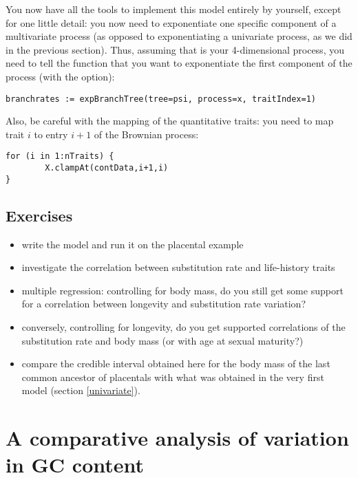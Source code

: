 You now have all the tools to implement this model entirely by yourself, except for one little detail: you now need to exponentiate one specific component of a multivariate process (as opposed to exponentiating a univariate process, as we did in the previous section). Thus, assuming that  is your 4-dimensional process, you need to tell the  function that you want to exponentiate the first component of the process (with the  option):
{\tt \small \begin{snugshade*}
\begin{lstlisting}
branchrates := expBranchTree(tree=psi, process=x, traitIndex=1)
\end{lstlisting}
\end{snugshade*}}
Also, be careful with the mapping of the quantitative traits: you need to map trait $i$ to entry $i+1$ of the Brownian process:
{\tt \small \begin{snugshade*}
\begin{lstlisting}
for (i in 1:nTraits) {
        X.clampAt(contData,i+1,i)
}
\end{lstlisting}
\end{snugshade*}}


\subsection{Exercises}

\begin{itemize}
\item
write the model and run it on the placental example
\item
investigate the correlation between substitution rate and life-history traits
\item
multiple regression: controlling for body mass, do you still get some support for a correlation between longevity and substitution rate variation?
\item
conversely, controlling for longevity, do you get supported correlations of the substitution rate and body mass (or with age at sexual maturity?)
\item
compare the credible interval obtained here for the body mass of the last common ancestor of placentals with what was obtained in the very first model (section \ref{univariate}).
\end{itemize}

\section{A comparative analysis of variation in GC content}

